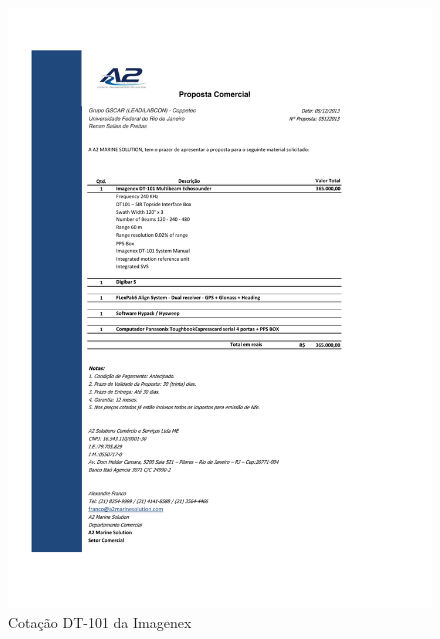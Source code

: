 \begin{figure}[h!]
 \centering
 \includegraphics[width=1\columnwidth]{Seaking_profiler/price_quote_1.pdf}
 \caption{Cotação DT-101 da Imagenex}
  
\end{figure}


